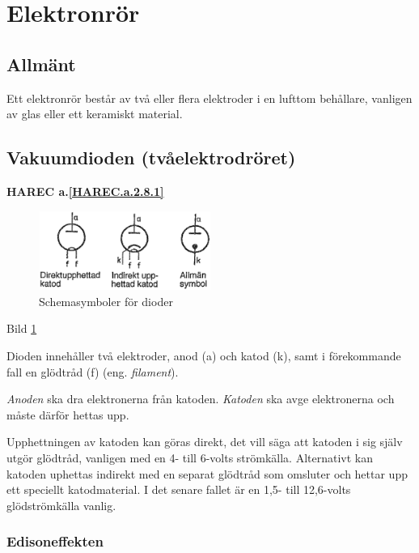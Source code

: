 \section{Elektronrör}
\label{elektronrör}

\subsection{Allmänt}

Ett elektronrör består av två eller flera elektroder i en lufttom behållare, vanligen av glas eller ett keramiskt material.

\subsection{Vakuumdioden (tvåelektrodröret)}
\textbf{HAREC a.\ref{HAREC.a.2.8.1}\label{myHAREC.a.2.8.1}}
\label{vakuumdioden}

\begin{figure}
\includegraphics[width=0.5\textwidth]{images/cropped_pdfs/bild_2_2-24.pdf}
\caption{Schemasymboler för dioder}
\label{fig:BildII2-24}
\end{figure}

Bild \ref{fig:BildII2-24}

Dioden innehåller två elektroder, anod (a) och katod (k), samt i förekommande fall en glödtråd (f) (eng. \emph{filament}).

\emph{Anoden} ska dra elektronerna från katoden.
\emph{Katoden} ska avge elektronerna och måste därför hettas upp.

Upphettningen av katoden kan göras direkt, det vill säga att katoden i sig själv utgör glödtråd, vanligen med en 4- till 6-volts strömkälla. Alternativt kan katoden uphettas indirekt med en separat glödtråd som omsluter och hettar upp ett speciellt katodmaterial. I det senare fallet är en 1,5- till 12,6-volts glödströmkälla vanlig.

\subsubsection{Edisoneffekten}

